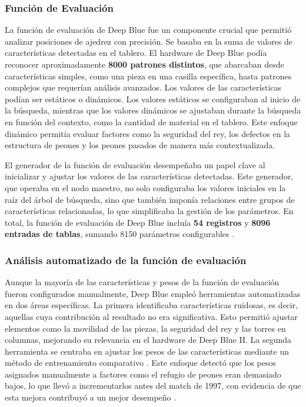 \documentclass[12pt,a4paper]{article}
\begin{document}
\subsubsection{Función de Evaluación}

La función de evaluación de Deep Blue fue un componente crucial que permitió analizar posiciones de ajedrez con precisión. Se basaba en la suma de valores de características detectadas en el tablero. El hardware de Deep Blue podía reconocer aproximadamente \textbf{8000 patrones distintos}, que abarcaban desde características simples, como una pieza en una casilla específica, hasta patrones complejos que requerían análisis avanzados. Los valores de las características podían ser estáticos o dinámicos. Los valores estáticos se configuraban al inicio de la búsqueda, mientras que los valores dinámicos se ajustaban durante la búsqueda en función del contexto, como la cantidad de material en el tablero. Este enfoque dinámico permitía evaluar factores como la seguridad del rey, los defectos en la estructura de peones y los peones pasados de manera más contextualizada.

El generador de la función de evaluación desempeñaba un papel clave al inicializar y ajustar los valores de las características detectadas. Este generador, que operaba en el nodo maestro, no solo configuraba los valores iniciales en la raíz del árbol de búsqueda, sino que también imponía relaciones entre grupos de características relacionadas, lo que simplificaba la gestión de los parámetros. En total, la función de evaluación de Deep Blue incluía \textbf{54 registros} y \textbf{8096 entradas de tablas}, sumando 8150 parámetros configurables \cite{campbell2002deepblue}.

\subsubsection*{Análisis automatizado de la función de evaluación}
Aunque la mayoría de las características y pesos de la función de evaluación fueron configurados manualmente, Deep Blue empleó herramientas automatizadas en dos áreas específicas. La primera identificaba características ruidosas, es decir, aquellas cuya contribución al resultado no era significativa. Esto permitió ajustar elementos como la movilidad de las piezas, la seguridad del rey y las torres en columnas, mejorando su relevancia en el hardware de Deep Blue II. La segunda herramienta se centraba en ajustar los pesos de las características mediante un método de entrenamiento comparativo \cite{campbell2002deepblue}. Este enfoque detectó que los pesos asignados manualmente a factores como el refugio de peones eran demasiado bajos, lo que llevó a incrementarlos antes del match de 1997, con evidencia de que esta mejora contribuyó a un mejor desempeño \cite{tesauro2001chess}.
\end{document}

